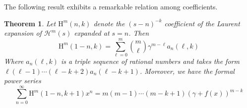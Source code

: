 \documentclass{article}
\newcommand{\pHz}[2]{\mathcal{H}^{#1}(#2)}
\newtheorem{theorem}{Theorem}
\begin{document}
The following result exhibits a remarkable relation among coefficients.

\begin{theorem}\label{Laurent expansion of H}
    Let $\mathrm{H}^m(n,k)$ denote the $(s-n)^{-k}$ coefficient of the Laurent expansion of $\pHz{m}{s}$ expanded at $s=n$. Then
    \begin{equation}\label{coefficient of expansion}\mathrm{H}^m(1-n,k)=\sum_{\ell=0}^m \binom{m}{\ell}\gamma^{m-\ell} a_n(\ell,k)\end{equation}
    Where $a_n(\ell, k)$ is a triple sequence of rational numbers and takes the form $\ell(\ell-1)\cdots(\ell -k+2)a_n(\ell-k+1)$. Moreover, we have the formal power series \begin{equation}
        \sum_{n=0}^{\infty}\mathrm{H}^m(1-n,k+1)x^n=m(m-1)\cdots(m-k+1)(\gamma+f(x))^{m-k}
    \end{equation}
\end{theorem}
\end{document}
